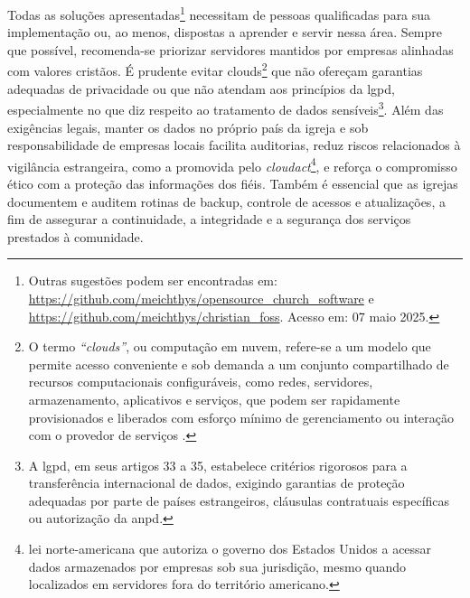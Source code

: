 Todas as soluções apresentadas\footnote{Outras sugestões podem ser encontradas em: \url{https://github.com/meichthys/opensource_church_software} e \url{https://github.com/meichthys/christian_foss}. Acesso em: 07 maio 2025.} necessitam de pessoas qualificadas para sua implementação ou, ao menos, dispostas a aprender e servir nessa área. Sempre que possível, recomenda-se priorizar servidores mantidos por empresas alinhadas com valores cristãos. É prudente evitar clouds\footnote{O termo \textit{``clouds''}, ou computação em nuvem, refere-se a um modelo que permite acesso conveniente e sob demanda a um conjunto compartilhado de recursos computacionais configuráveis, como redes, servidores, armazenamento, aplicativos e serviços, que podem ser rapidamente provisionados e liberados com esforço mínimo de gerenciamento ou interação com o provedor de serviços \cite{nist_cloud_definition}.} que não ofereçam garantias adequadas de privacidade ou que não atendam aos princípios da \gls{lgpd}, especialmente no que diz respeito ao tratamento de dados sensíveis\footnote{A \gls{lgpd}, em seus artigos 33 a 35, estabelece critérios rigorosos para a transferência internacional de dados, exigindo garantias de proteção adequadas por parte de países estrangeiros, cláusulas contratuais específicas ou autorização da \gls{anpd}.}. Além das exigências legais, manter os dados no próprio país da igreja e sob responsabilidade de empresas locais facilita auditorias, reduz riscos relacionados à vigilância estrangeira, como a promovida pelo \textit{\gls{cloudact}}\footnote{lei norte-americana que autoriza o governo dos Estados Unidos a acessar dados armazenados por empresas sob sua jurisdição, mesmo quando localizados em servidores fora do território americano.}\cite{harvard_cloudact_2018,brooklyn_cloudact_2020}, e reforça o compromisso ético com a proteção das informações dos fiéis. Também é essencial que as igrejas documentem e auditem rotinas de backup, controle de acessos e atualizações, a fim de assegurar a continuidade, a integridade e a segurança dos serviços prestados à comunidade.

